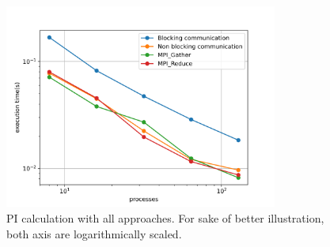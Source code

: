 \documentclass[12pt]{article}
\begin{document}
\begin{figure}[H]
  \centering
  \includegraphics[width=0.8\textwidth]{all.png}
  \caption{PI calculation with all approaches. For sake of better illustration, both axis are logarithmically scaled.}
  \label{fig:blocking}
\end{figure}
\end{document}
